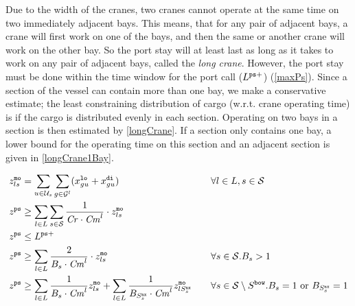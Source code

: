Due to the width of the cranes, two cranes cannot operate at the same time on two immediately adjacent bays. This means, that for any pair of adjacent bays, a crane will first work on one of the bays, and then the same or another crane will work on the other bay. So the port stay will at least last as long as it takes to work on any pair of adjacent bays, called the \emph{long crane}. However, the port stay must be done within the time window for the port call ($L^{\texttt{ps}+}$) (\ref{maxPs}). Since a section of the vessel can contain more than one bay, we make a conservative estimate; the least constraining distribution of cargo (w.r.t. crane operating time) is if the cargo is distributed evenly in each section. Operating on two bays in a section is then estimated by \eqref{longCrane}. If a section only contains one bay, a lower bound for the operating time on this section and an adjacent section is given in \eqref{longCrane1Bay}.

\begin{alignat}{4}
\label{defMoves}
&z^\ttt{mo}_{ls} = \sum_{u\in \mc{U}_{s}}\sum_{g\in \mc{G}^l}(x^\ttt{lo}_{gu} + x^\ttt{di}_{gu}) 
																																											&&\forall l\in L, s\in \mc{S}\\
\label{minPortStay}
&z^{\ttt{ps}} \geq \sum_{l\in L}\sum_{s\in\mc{S}} \frac{1}{\mi{Cr}\cdot \mi{Cm}^{l}}\cdot z^\ttt{mo}_{ls} \\
%
\label{maxPs}
& z^\ttt{ps}\leq L^{\ttt{ps}+}\\
%																							
\label{longCrane}
&z^{\ttt{ps}} \geq \sum_{l\in L}\frac{2}{B_{s}\cdot \mi{Cm}^{l}}\cdot z^\ttt{mo}_{ls}	&& \forall s\in\mc{S}. B_s > 1\\
%
\label{longCrane1Bay}
&z^\ttt{ps} \geq \sum_{l\in L}\frac{1}{B_s\cdot \mi{Cm}^l} z^\ttt{mo}_{ls} + \sum_{l\in L}\frac{1}{B_{S^\ttt{nx}_s}\cdot \mi{Cm}^{l}} z^\ttt{mo}_{lS^\ttt{nx}_s}\quad	
																																											&& \forall s\in\mc{S}\setminus S^\ttt{bow}. B_s = 1 \text{ or } B_{S^\ttt{nx}_s} = 1
\end{alignat}

